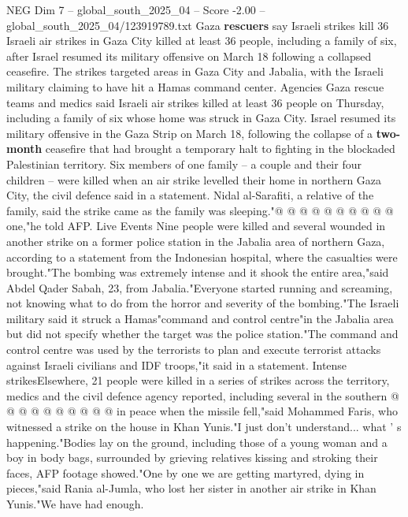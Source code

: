 \begin{textsample}{NEG Dim 7 – global\_south\_2025\_04 – Score -2.00 – global\_south\_2025\_04/123919789.txt}  \label{ex:f7_neg_045}
Gaza \textbf{rescuers} say Israeli strikes kill 36 Israeli air strikes in Gaza City killed at least 36 people, including a family of six, after Israel resumed its military offensive on March 18 following a collapsed ceasefire.
The strikes targeted areas in Gaza City and Jabalia, with the Israeli military claiming to have hit a Hamas command center.
Agencies Gaza rescue teams and medics said Israeli air strikes killed at least 36 people on Thursday, including a family of six whose home was struck in Gaza City.
Israel resumed its military offensive in the Gaza Strip on March 18, following the collapse of a \textbf{two-month} ceasefire that had brought a temporary halt to fighting in the blockaded Palestinian territory.
Six members of one family -- a couple and their four children -- were killed when an air strike levelled their home in northern Gaza City, the civil defence said in a statement.
Nidal al-Sarafiti, a relative of the family, said the strike came as the family was sleeping."@ @ @ @ @ @ @ @ @ @ one,"he told AFP.
Live Events Nine people were killed and several wounded in another strike on a former police station in the Jabalia area of northern Gaza, according to a statement from the Indonesian hospital, where the casualties were brought."The bombing was extremely intense and it shook the entire area,"said Abdel Qader Sabah, 23, from Jabalia."Everyone started running and screaming, not knowing what to do from the horror and severity of the bombing."The Israeli military said it struck a Hamas"command and control centre"in the Jabalia area but did not specify whether the target was the police station."The command and control centre was used by the terrorists to plan and execute terrorist attacks against Israeli civilians and IDF troops,"it said in a statement.
Intense strikesElsewhere, 21 people were killed in a series of strikes across the territory, medics and the civil defence agency reported, including several in the southern @ @ @ @ @ @ @ @ @ @ in peace when the missile fell,"said Mohammed Faris, who witnessed a strike on the house in Khan Yunis."I just don't understand... what ' s happening."Bodies lay on the ground, including those of a young woman and a boy in body bags, surrounded by grieving relatives kissing and stroking their faces, AFP footage showed."One by one we are getting martyred, dying in pieces,"said Rania al-Jumla, who lost her sister in another air strike in Khan Yunis."We have had enough.

\end{textsample}
